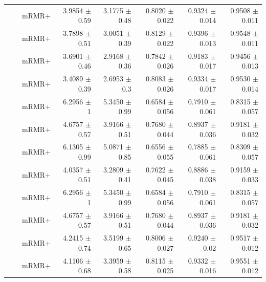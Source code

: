 \begin{longtable}{llp{}rrrrr}
 &  & mRMR+ & 3.9854 {\scriptsize $\pm$ 0.59} & 3.1775 {\scriptsize $\pm$ 0.48} & 0.8020 {\scriptsize $\pm$ 0.022} & 0.9324 {\scriptsize $\pm$ 0.014} & 0.9508 {\scriptsize $\pm$ 0.011} \\
 &  & mRMR+ & 3.7898 {\scriptsize $\pm$ 0.51} & 3.0051 {\scriptsize $\pm$ 0.39} & 0.8129 {\scriptsize $\pm$ 0.022} & 0.9396 {\scriptsize $\pm$ 0.013} & 0.9548 {\scriptsize $\pm$ 0.011} \\
 &  & mRMR+ & 3.6901 {\scriptsize $\pm$ 0.46} & 2.9168 {\scriptsize $\pm$ 0.36} & 0.7842 {\scriptsize $\pm$ 0.026} & 0.9183 {\scriptsize $\pm$ 0.017} & 0.9456 {\scriptsize $\pm$ 0.013} \\
 &  & mRMR+ & 3.4089 {\scriptsize $\pm$ 0.39} & 2.6953 {\scriptsize $\pm$ 0.3} & 0.8083 {\scriptsize $\pm$ 0.026} & 0.9334 {\scriptsize $\pm$ 0.017} & 0.9530 {\scriptsize $\pm$ 0.014} \\
 &  & mRMR+ & 6.2956 {\scriptsize $\pm$ 1} & 5.3450 {\scriptsize $\pm$ 0.99} & 0.6584 {\scriptsize $\pm$ 0.056} & 0.7910 {\scriptsize $\pm$ 0.061} & 0.8315 {\scriptsize $\pm$ 0.057} \\
 &  & mRMR+ & 4.6757 {\scriptsize $\pm$ 0.57} & 3.9166 {\scriptsize $\pm$ 0.51} & 0.7680 {\scriptsize $\pm$ 0.044} & 0.8937 {\scriptsize $\pm$ 0.036} & 0.9181 {\scriptsize $\pm$ 0.032} \\
 &  & mRMR+ & 6.1305 {\scriptsize $\pm$ 0.99} & 5.0871 {\scriptsize $\pm$ 0.85} & 0.6556 {\scriptsize $\pm$ 0.055} & 0.7885 {\scriptsize $\pm$ 0.061} & 0.8309 {\scriptsize $\pm$ 0.057} \\
 &  & mRMR+ & 4.0357 {\scriptsize $\pm$ 0.51} & 3.2809 {\scriptsize $\pm$ 0.41} & 0.7622 {\scriptsize $\pm$ 0.045} & 0.8886 {\scriptsize $\pm$ 0.038} & 0.9159 {\scriptsize $\pm$ 0.033} \\
 &  & mRMR+ & 6.2956 {\scriptsize $\pm$ 1} & 5.3450 {\scriptsize $\pm$ 0.99} & 0.6584 {\scriptsize $\pm$ 0.056} & 0.7910 {\scriptsize $\pm$ 0.061} & 0.8315 {\scriptsize $\pm$ 0.057} \\
 &  & mRMR+ & 4.6757 {\scriptsize $\pm$ 0.57} & 3.9166 {\scriptsize $\pm$ 0.51} & 0.7680 {\scriptsize $\pm$ 0.044} & 0.8937 {\scriptsize $\pm$ 0.036} & 0.9181 {\scriptsize $\pm$ 0.032} \\
 &  & mRMR+ & 4.2415 {\scriptsize $\pm$ 0.74} & 3.5199 {\scriptsize $\pm$ 0.65} & 0.8006 {\scriptsize $\pm$ 0.027} & 0.9240 {\scriptsize $\pm$ 0.02} & 0.9517 {\scriptsize $\pm$ 0.012} \\
 &  & mRMR+ & 4.1106 {\scriptsize $\pm$ 0.68} & 3.3959 {\scriptsize $\pm$ 0.58} & 0.8115 {\scriptsize $\pm$ 0.025} & 0.9332 {\scriptsize $\pm$ 0.016} & 0.9551 {\scriptsize $\pm$ 0.012} \\

\end{longtable}
